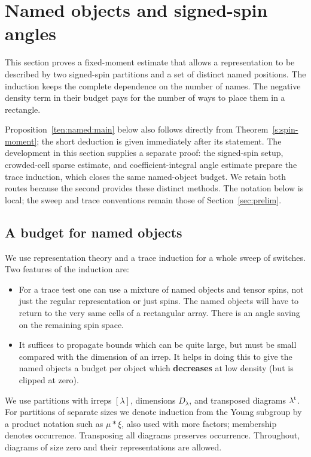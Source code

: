 \section{Named objects and signed-spin angles}
\label{ten:named}
This section proves a fixed-moment estimate that allows a representation to be described by two signed-spin partitions and a set of distinct named positions. The induction keeps the complete dependence on the number of names. The negative density term in their budget pays for the number of ways to place them in a rectangle.

Proposition~\ref{ten:named:main} below also follows directly from Theorem~\ref{s:spin-moment}; the short deduction is given immediately after its statement. The development in this section supplies a separate proof: the signed-spin setup, crowded-cell sparse estimate, and coefficient-integral angle estimate prepare the trace induction, which closes the same named-object budget. We retain both routes because the second provides these distinct methods.
\smallskip
The notation below is local; the sweep and trace conventions remain those of Section~\ref{sec:prelim}.

\subsection{A budget for named objects}
We use representation theory and a trace induction for a whole sweep of switches. Two features of the induction are:

\begin{itemize}
\item For a trace test one can use a mixture of named objects and tensor spins, not just the regular representation or just spins. The named objects will have to return to the very same cells of a rectangular array. There is an angle saving on the remaining spin space.
\item It suffices to propagate bounds which can be quite large, but must be small compared with the dimension of an irrep. It helps in doing this to give the named objects a budget per object which \textbf{decreases} at low density (but is clipped at zero).
\end{itemize}

We use partitions with irreps \([\lambda]\), dimensions \(D_\lambda\), and transposed diagrams \(\lambda^{\rm t}\). For partitions of separate sizes we denote induction from the Young subgroup by a product notation such as \(\mu*\xi\), also used with more factors; membership denotes occurrence. Transposing all diagrams preserves occurrence. Throughout, diagrams of size zero and their representations are allowed.


